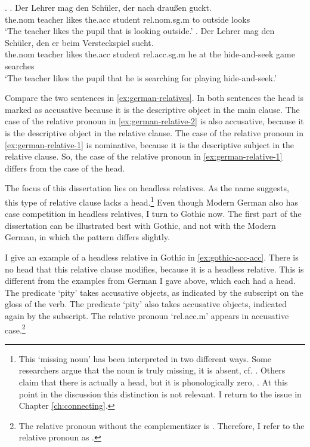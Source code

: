 \ex.\label{ex:german-relatives}
\ag. Der Lehrer mag den Schüler, der nach draußen guckt.\\
 the.\ac{nom} teacher likes the.\ac{acc} student \ac{rel}.\ac{nom}.\ac{sg}.\ac{m} to outside looks\\
 `The teacher likes the pupil that is looking outside.'\label{ex:german-relative-1}
 \bg. Der Lehrer mag den Schüler, den er beim Versteckspiel sucht.\\
 the.\ac{nom} teacher likes the.\ac{acc} student \ac{rel}.\ac{acc}.\ac{sg}.\ac{m} he {at the} {hide-and-seek game} searches\\
 `The teacher likes the pupil that he is searching for playing hide-and-seek.'\label{ex:german-relative-2}

Compare the two sentences in \ref{ex:german-relatives}. In both sentences the head is marked as accusative because it is the descriptive object in the main clause. The case of the relative pronoun in \ref{ex:german-relative-2} is also accusative, because it is the descriptive object in the relative clause. The case of the relative pronoun in \ref{ex:german-relative-1} is nominative, because it is the descriptive subject in the relative clause. So, the case of the relative pronoun in \ref{ex:german-relative-1} differs from the case of the head.

The focus of this dissertation lies on headless relatives. As the name suggests, this type of relative clause lacks a head.\footnote{
This `missing noun' has been interpreted in two different ways. Some researchers argue that the noun is truly missing, it is absent, cf. \citealt{citko2005,vanriemsdijk2006}. Others claim that there is actually a head, but it is phonologically zero, \citealt{bresnan1978,groos1981,grosu2003}. At this point in the discussion this distinction is not relevant. I return to the issue in Chapter \ref{ch:connecting}.
}
Even though Modern German also has case competition in headless relatives, I turn to Gothic now. The first part of the dissertation can be illustrated best with Gothic, and not with the Modern German, in which the pattern differs slightly.

I give an example of a headless relative in Gothic in \ref{ex:gothic-acc-acc}.
There is no head that this relative clause modifies, because it is a headless relative. This is different from the examples from German I gave above, which each had a head.
The predicate  `pity' takes accusative objects, as indicated by the subscript on the gloss of the verb. The predicate  `pity' also takes accusative objects, indicated again by the subscript.
The relative pronoun  `\ac{rel}.\ac{acc}.\ac{m}' appears in accusative case.\footnote{
The relative pronoun without the complementizer  is . Therefore, I refer to the relative pronoun as .
}

